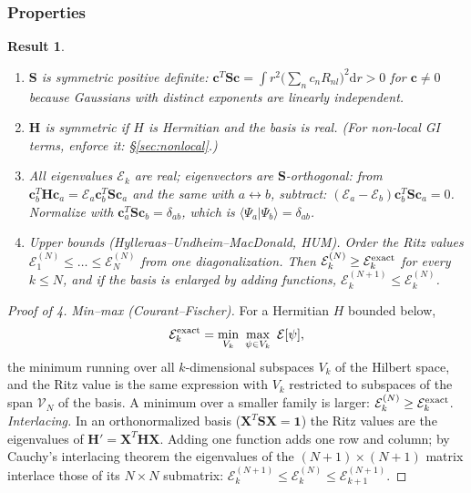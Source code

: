 \documentclass[11pt,a4paper]{article}
\numberwithin{equation}{section}
\theoremstyle{definition}
\theoremstyle{plain}
\newtheorem{result}[definition]{Result}
\theoremstyle{remark}
\numberwithin{algorithm}{section}
\newcommand{\dd}{\mathrm{d}}
\newcommand{\braket}[2]{\langle #1|#2\rangle}
\newcommand{\mH}{\mathbf H}
\newcommand{\mS}{\mathbf S}
\newcommand{\mX}{\mathbf X}
\newcommand{\vc}{\bm c}
\begin{document}
\subsubsection{Properties}
\begin{result}
\begin{enumerate}[leftmargin=1.5em,itemsep=1pt]
\item $\mS$ is symmetric positive definite: $\vc^T\mS\vc=\int r^2\big(\sum_nc_nR_{nl}\big)^2\dd r>0$ for $\vc\neq0$ because Gaussians with distinct exponents are linearly independent.
\item $\mH$ is symmetric if $H$ is Hermitian and the basis is real. (For non-local GI terms, enforce it: \S\ref{sec:nonlocal}.)
\item All eigenvalues $\mathcal E_k$ are real; eigenvectors are $\mS$-orthogonal: from $\vc_b^T\mH\vc_a=\mathcal E_a\vc_b^T\mS\vc_a$ and the same with $a\leftrightarrow b$, subtract: $(\mathcal E_a-\mathcal E_b)\vc_b^T\mS\vc_a=0$. Normalize with $\vc_a^T\mS\vc_b=\delta_{ab}$, which is $\braket{\Psi_a}{\Psi_b}=\delta_{ab}$.
\item \emph{Upper bounds (Hylleraas--Undheim--MacDonald, HUM).} Order the Ritz values $\mathcal E_1^{(N)}\le\dots\le\mathcal E_N^{(N)}$ from one diagonalization. Then $\mathcal E_k^{(N)}\ge\mathcal E_k^{\rm exact}$ for every $k\le N$, and if the basis is enlarged by \emph{adding} functions, $\mathcal E_k^{(N+1)}\le\mathcal E_k^{(N)}$.
\end{enumerate}
\end{result}
\begin{proof}[Proof of 4]
\emph{Min--max (Courant--Fischer).} For a Hermitian $H$ bounded below,
\[
\mathcal E_k^{\rm exact}=\min_{V_k}\ \max_{\psi\in V_k}\ \mathcal E[\psi],
\]
the minimum running over all $k$-dimensional subspaces $V_k$ of the Hilbert space, and the Ritz value is the same expression with $V_k$ restricted to subspaces of the span $\mathcal V_N$ of the basis. A minimum over a smaller family is larger: $\mathcal E_k^{(N)}\ge\mathcal E_k^{\rm exact}$.
\emph{Interlacing.} In an orthonormalized basis ($\mX^T\mS\mX=\mathbf1$) the Ritz values are the eigenvalues of $\mH'=\mX^T\mH\mX$. Adding one function adds one row and column; by Cauchy's interlacing theorem the eigenvalues of the $(N+1)\times(N+1)$ matrix interlace those of its $N\times N$ submatrix: $\mathcal E_k^{(N+1)}\le\mathcal E_k^{(N)}\le\mathcal E_{k+1}^{(N+1)}$.
\end{proof}
\end{document}
